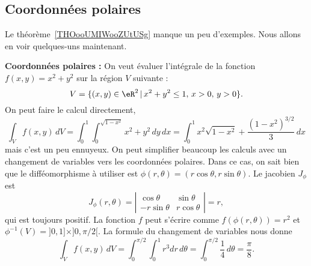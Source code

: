 \subsection{Coordonnées polaires}
\label{SUBSECooUUAKooMSJHsL}

Le théorème~\ref{THOooUMIWooZUtUSg} manque un peu d'exemples. Nous allons en voir quelques-uns maintenant.

\begin{example}
\textbf{Coordonnées polaires : }On veut évaluer l'intégrale de la fonction $f(x,y)= x^2+y^2$ sur la région $V$ suivante :
\[
V=\{(x,y) \in \eR^2\,\vert\, x^2+y^2\leq 1,\, x>0,\, y>0\}.
\]
On peut faire le calcul directement,
\[
\int_{V}f(x,y)\, dV=\int_0^1\int_0^{\sqrt{1-x^2}}x^2+y^2\, dy\,dx=\int_0^1x^2\sqrt{1-x^2} + \frac{(1-x^2)^{3/2}}{3}\, dx
\]
mais c'est un peu ennuyeux. On peut simplifier beaucoup les calculs avec un changement de variables vers les coordonnées polaires. Dans ce cas, on sait bien que le difféomorphisme à utiliser est $\phi(r,\theta)=(r\cos \theta, r\sin\theta)$. Le jacobien  $J_{\phi}$ est
\begin{equation}
 J_{\phi}(r, \theta)= \left\vert\begin{array}{cc}
\cos \theta & \sin \theta \\
-r\sin \theta  & r\cos \theta
\end{array}\right\vert= r,
\end{equation}
qui est toujours positif. La fonction $f$ peut s'écrire comme $f(\phi(r,\theta))=r^2$ et $\phi^{-1}(V)=]0,1]\times]0, \pi/2[$.
La formule du changement de variables nous donne
\[
\int_{V}f(x,y)\, dV=\int_0^{\pi/2}\int_0^{1}r^3 dr\,d\theta=\int_0^{\pi/2}\frac{1}{4}\,d\theta=\frac{\pi}{8}.
\]
\end{example}


